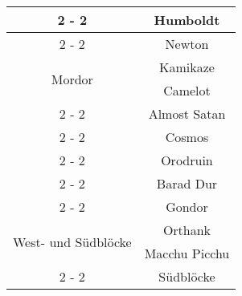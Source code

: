 \documentclass{article}%
\begin{document}
\begin{tabular}{|c|c|}
\cline{2%
-%
2}%
&Humboldt\\%
\cline{2%
-%
2}%
&Newton\\%
\hline%
\multirow{2}{*}{Mordor}&Kamikaze\\%
\cline{2%
-%
2}%
&Camelot\\%
\cline{2%
-%
2}%
&Almost Satan\\%
\cline{2%
-%
2}%
&Cosmos\\%
\cline{2%
-%
2}%
&Orodruin\\%
\cline{2%
-%
2}%
&Barad Dur\\%
\cline{2%
-%
2}%
&Gondor\\%
\hline%
\multirow{2}{*}{West{-} und Südblöcke}&Orthank\\%
\cline{2%
-%
2}%
&Macchu Picchu\\%
\cline{2%
-%
2}%
&Südblöcke\\%
\hline%
\end{tabular}

%
\end{document}

